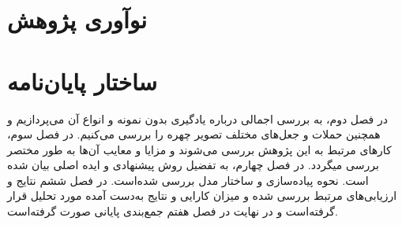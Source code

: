 \section{نوآوری پژوهش}
\section{ساختار پایان‌نامه}
در فصل دوم، به بررسی اجمالی درباره یادگیری بدون نمونه و انواع آن  می‌پردازیم و همچنین حملات و جعل‌های مختلف تصویر چهره را بررسی می‌کنیم. در فصل سوم، کارهای مرتبط به این پژوهش بررسی می‌شوند و مزایا و معایب آن‌ها به طور مختصر بررسی میگردد. در فصل چهارم، به تفضیل روش پیشنهادی و ایده اصلی بیان شده است. نحوه پیاده‌سازی و ساختار مدل بررسی شده‌است. در فصل ششم نتایج و ارزیابی‌های مرتبط بررسی شده و میزان کارایی و نتایج به‌دست آمده مورد تحلیل قرار گرفته‌است و در نهایت در فصل هفتم جمع‌بندی پایانی صورت گرفته‌است.
%
%
%
